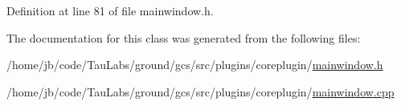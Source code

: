 \-Definition at line 81 of file mainwindow.\-h.



\-The documentation for this class was generated from the following files\-:\begin{DoxyCompactItemize}
\item 
/home/jb/code/\-Tau\-Labs/ground/gcs/src/plugins/coreplugin/\hyperlink{mainwindow_8h}{mainwindow.\-h}\item 
/home/jb/code/\-Tau\-Labs/ground/gcs/src/plugins/coreplugin/\hyperlink{mainwindow_8cpp}{mainwindow.\-cpp}\end{DoxyCompactItemize}
